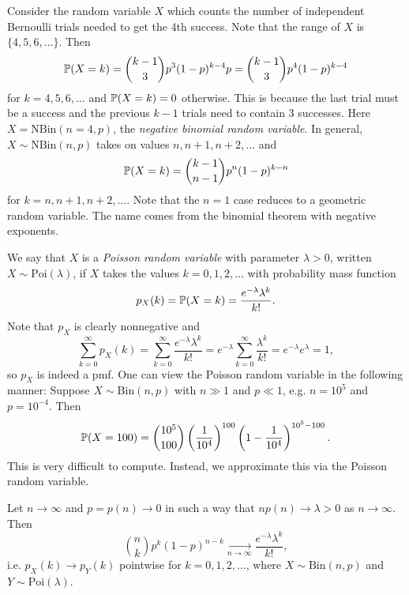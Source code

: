 \begin{example}
  Consider the random variable $X$ which counts
  the number of independent Bernoulli trials
  needed to get the 4th success. Note that the
  range of $X$ is $\{4, 5, 6, \dots\}$. Then
  \[
    \mathbb{P}(X = k) = \binom{k - 1}{3} p^3(1 - p)^{k - 4} p
    = \binom{k - 1}{3} p^4 (1 - p)^{k - 4}
  \]
  for $k = 4, 5, 6, \dots$ and $\mathbb{P}(X = k) = 0$
  otherwise.
  This is because
  the last trial must be a success and the
  previous $k - 1$ trials need to contain $3$
  successes. Here $X = \mathrm{NBin}(n = 4, p)$,
  the \emph{negative binomial random variable}. In general,
  $X \sim \mathrm{NBin}(n, p)$ takes on values
  $n, n + 1, n + 2, \dots$ and
  \[
    \mathbb{P}(X = k) = \binom{k - 1}{n - 1} p^n (1 - p)^{k - n}
  \]
  for $k = n, n + 1, n + 2, \dots$. Note that
  the $n = 1$
  case reduces to a geometric random variable.
  The name
  comes from the binomial theorem with negative
  exponents.
\end{example}

\begin{example}
  We say that $X$ is a \emph{Poisson random variable}
  with parameter $\lambda > 0$, written
  $X \sim \mathrm{Poi}(\lambda)$, if $X$ takes the
  values $k = 0, 1, 2, \dots$ with probability mass
  function
  \[
    p_X(k) = \mathbb{P}(X = k) = \frac{e^{-\lambda} \lambda^k}{k!}.
  \]
  Note that $p_X$ is clearly nonnegative and
  \[
    \sum_{k = 0}^\infty p_X(k) = \sum_{k = 0}^\infty \frac{e^{-\lambda} \lambda^k}{k!}
    = e^{-\lambda} \sum_{k = 0}^\infty \frac{\lambda^k}{k!}
    = e^{-\lambda} e^\lambda = 1,
  \]
  so $p_X$ is indeed a pmf. One can view the
  Poisson random variable in the following manner:
  Suppose $X \sim \mathrm{Bin}(n, p)$ with
  $n \gg 1$ and $p \ll 1$, e.g. $n = 10^5$ and
  $p = 10^{-4}$. Then
  \[
    \mathbb{P}(X = 100) =
    \binom{10^5}{100} \left(\frac{1}{10^4}\right)^{100}
    \left(1 - \frac{1}{10^4}\right)^{10^5 - 100}.
  \]
  This is very difficult to compute.
  Instead, we approximate this via the Poisson
  random variable.
\end{example}

\begin{prop}
  Let $n \to \infty$ and $p = p(n) \to 0$ in such
  a way that $np(n) \to \lambda > 0$ as $n \to \infty$.
  Then
  \[
    \binom{n}{k} p^k (1 - p)^{n - k} \xrightarrow[n \to \infty]{} \frac{e^{-\lambda} \lambda^k}{k!},
  \]
  i.e. $p_X(k) \to p_Y(k)$ pointwise for
  $k = 0, 1, 2, \dots$, where $X \sim \mathrm{Bin}(n, p)$
  and $Y \sim \mathrm{Poi}(\lambda)$.
\end{prop}

